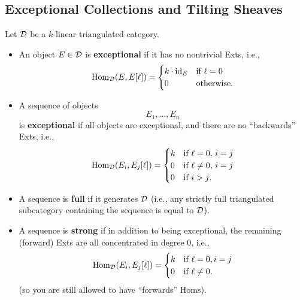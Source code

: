 \documentclass[12pt]{article}
\begin{document}
\subsection{Exceptional Collections and Tilting Sheaves}
\begin{defn}
    Let $\mathcal{D}$ be a $k$-linear triangulated category.
    \begin{itemize}
        \item An object $E\in \mathcal{D}$ is \textbf{exceptional} if it has no nontrivial Exts, i.e.,
        \[\mathrm{Hom}_{\mathcal{D}}(E,E[\ell]) = \begin{cases}
            k \cdot \mathrm{id}_E & \text{if $\ell=0$}\\
            0 & \text{otherwise.}
        \end{cases}\]
        \item A sequence of objects
        \[E_1,\dots,E_n\]
        is \textbf{exceptional} if all objects are exceptional, and there are no ``backwards'' Exts, i.e.,
        \[\mathrm{Hom}_{\mathcal{D}}(E_i,E_j[\ell])=\begin{cases}
            k & \text{if $\ell=0$, $i=j$}\\
            0 & \text{if $\ell\neq 0$, $i=j$}\\
            0 & \text{if $i>j$.}
        \end{cases}\]
        \item A sequence is \textbf{full} if it generates $\mathcal{D}$ (i.e., any strictly full triangulated subcategory containing the sequence is equal to $\mathcal{D}$).
        \item A sequence is \textbf{strong} if in addition to being exceptional, the remaining (forward) Exts are all concentrated in degree 0, i.e.,
        \[\mathrm{Hom}_{\mathcal{D}}(E_i,E_j[\ell]) = \begin{cases}
            k & \text{if $\ell=0,i=j$}\\
            0 & \text{if $\ell\neq 0$.}
        \end{cases}\]
        (so you are still allowed to have ``forwards'' Homs).
    \end{itemize}
\end{defn}
\end{document}
